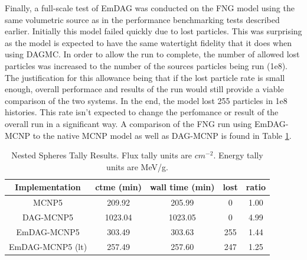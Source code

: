 \documentclass[12pt, a4paper]{article}
\begin{document}
Finally, a full-scale test of EmDAG was conducted on the FNG model using the same volumetric source as in the performance benchmarking tests described earlier. Initially this model failed quickly due to lost particles. This was surprising as the model is expected to have the same watertight fidelity that it does when using DAGMC. In order to allow the run to complete, the number of allowed lost particles was increased to the number of the sources particles being run (1e8). The justification for this allowance being that if the lost particle rate is small enough, overall performace and results of the run would still provide a viable comparison of the two systems. In the end, the model lost 255 particles in 1e8 histories. This rate isn't expected to change the perfomance or result of the overall run in a significant way. A comparison of the FNG run using EmDAG-MCNP to the native MCNP model as well as DAG-MCNP is found in Table \ref{fngemdag}.


\begin{table}[H]
  \small
  \begin{center}
    \caption{Nested Spheres Tally Results. Flux tally units are $cm^{-2}$. Energy tally units are MeV/g.}
    \label{fngemdag}
        \begin{tabular}{|c|c|c|c|c|}
      \hline
      \textbf{Implementation} & \textbf{ctme (min)} & \textbf{wall time (min)} & \textbf{lost} & \textbf{ratio} \\
      \hline
      MCNP5 & 209.92 & 205.99 & 0 & 1.00 \\
      \hline
      DAG-MCNP5 & 1023.04 & 1023.05 & 0 & 4.99 \\
      \hline
      EmDAG-MCNP5 & 303.49 & 303.63 & 255 & 1.44 \\
      \hline
      EmDAG-MCNP5 (lt) & 257.49 & 257.60 & 247 & 1.25 \\
      \hline
    \end{tabular} 

  \end{center}
\end{table}
\end{document}
